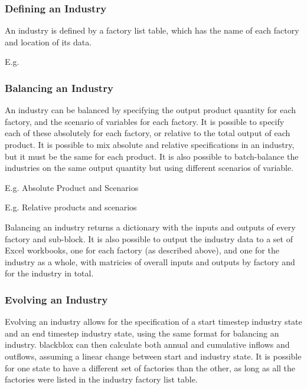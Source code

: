 \documentclass[a4paper,10pt,english]{sphinxmanual}
\begin{document}
\subsubsection{Defining an Industry}
\label{\detokenize{intro:defining-an-industry}}
An industry is defined by a factory list table, which has the name of each factory and location of its data.

E.g.




\subsubsection{Balancing an Industry}
\label{\detokenize{intro:balancing-an-industry}}
An industry can be balanced by specifying the output product quantity for each factory, and the scenario of variables for each factory. It is possible to specify each of these absolutely for each factory, or relative to the total output of each product. It is possible to mix absolute and relative specifications in an industry, but it must be the same for each product. It is also possible to batch-balance the industries on the same output quantity but using different scenarios of variable.

E.g. Absolute Product and Scenarios



E.g. Relative products and scenarios



Balancing an industry returns a dictionary with the inputs and outputs of every factory and sub-block. It is also possible to output the industry data to a set of Excel workbooks, one for each factory (as described above), and one for the industry as a whole, with matricies of overall inputs and outputs by factory and for the industry in total.


\subsubsection{Evolving an Industry}
\label{\detokenize{intro:evolving-an-industry}}
Evolving an industry allows for the specification of a start timestep industry state and an end timestep industry state, using the same format for balancing an industry. blackblox can then calculate both annual and cumulative inflows and outflows, assuming a linear change between start and industry state. It is possible for one state to have a different set of factories than the other, as long as all the factories were listed in the industry factory list table.
\end{document}
